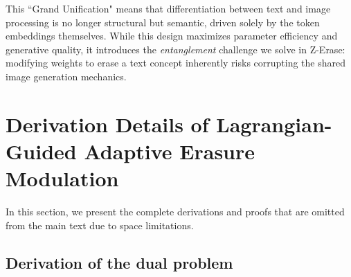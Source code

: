This ``Grand Unification" means that differentiation between text and image processing is no longer structural but semantic, driven solely by the token embeddings themselves. While this design maximizes parameter efficiency and generative quality, it introduces the \emph{entanglement} challenge we solve in Z-Erase: modifying weights to erase a text concept inherently risks corrupting the shared image generation mechanics.


\section{Derivation Details of Lagrangian-Guided Adaptive Erasure Modulation}


In this section, we present the complete derivations and proofs that are omitted from the main text due to space limitations.


\subsection{Derivation of the dual problem}
\label{appendix: Derivation of the dual problem}

